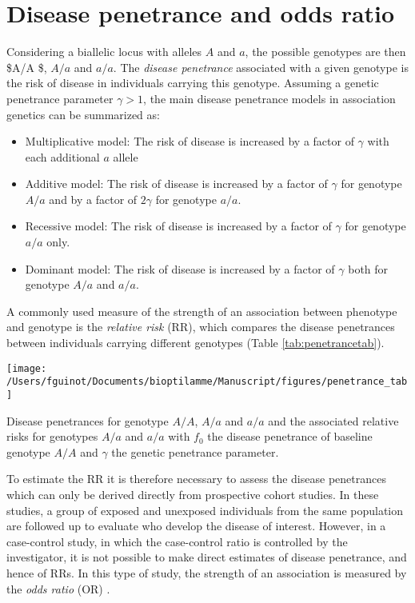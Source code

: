 \documentclass[]{book}
\begin{document}
\hypertarget{OR}{%
\section{Disease penetrance and odds ratio}\label{OR}}

Considering a biallelic locus with alleles \(A\) and \(a\), the possible
genotypes are then \$A/A \$, \(A/a\) and \(a/a\). The \emph{disease penetrance}
associated with a given genotype is the risk of disease in individuals
carrying this genotype. Assuming a genetic penetrance parameter
\(\gamma > 1\), the main disease penetrance models in association genetics
can be summarized as:

\begin{itemize}
\item
  Multiplicative model: The risk of disease is increased by a factor
  of \(\gamma\) with each additional \(a\) allele
\item
  Additive model: The risk of disease is increased by a factor of
  \(\gamma\) for genotype \(A/a\) and by a factor of \(2 \gamma\) for
  genotype \(a/a\).
\item
  Recessive model: The risk of disease is increased by a factor of
  \(\gamma\) for genotype \(a/a\) only.
\item
  Dominant model: The risk of disease is increased by a factor of
  \(\gamma\) both for genotype \(A/a\) and \(a/a\).
\end{itemize}

A commonly used measure of the strength of an association between
phenotype and genotype is the \emph{relative risk} (RR), which compares the
disease penetrances between individuals carrying different genotypes
(Table \ref{tab:penetrancetab}).

\begin{center}\texttt{[image: /Users/fguinot/Documents/bioptilamme/Manuscript/figures/penetrance\_tab]} \end{center}

\label{tab:penetrancetab}Disease penetrances for genotype \(A/A\), \(A/a\) and \(a/a\) and the associated relative risks for genotypes \(A/a\) and \(a/a\) with \(f_0\) the disease penetrance of baseline genotype \(A/A\) and \(\gamma\) the genetic penetrance parameter.

To estimate the RR it is therefore necessary to assess the disease
penetrances which can only be derived directly from prospective cohort
studies. In these studies, a group of exposed and unexposed individuals
from the same population are followed up to evaluate who develop the
disease of interest. However, in a case-control study, in which the
case-control ratio is controlled by the investigator, it is not possible
to make direct estimates of disease penetrance, and hence of RRs. In
this type of study, the strength of an association is measured by the
\emph{odds ratio} (OR) \citep{clarke2011basic}.
\end{document}
